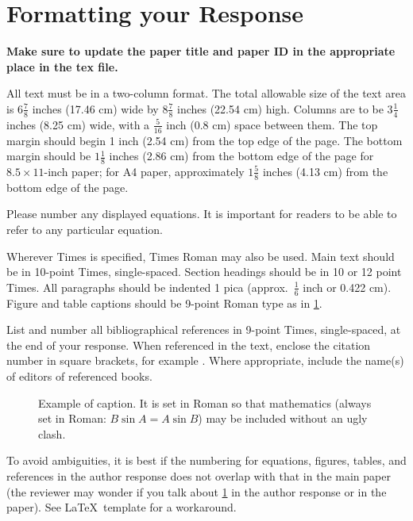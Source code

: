 \documentclass[10pt,twocolumn,letterpaper]{article}
\begin{document}
\section{Formatting your Response}

 {\bf Make sure to update the paper title and paper ID in the appropriate place in the tex file.}

All text must be in a two-column format.
The total allowable size of the text area is $6\frac78$ inches (17.46 cm) wide by $8\frac78$ inches (22.54 cm) high.
Columns are to be $3\frac14$ inches (8.25 cm) wide, with a $\frac{5}{16}$ inch (0.8 cm) space between them.
The top margin should begin 1 inch (2.54 cm) from the top edge of the page.
The bottom margin should be $1\frac{1}{8}$ inches (2.86 cm) from the bottom edge of the page for $8.5 \times 11$-inch paper;
for A4 paper, approximately $1\frac{5}{8}$ inches (4.13 cm) from the bottom edge of the page.

Please number any displayed equations.
It is important for readers to be able to refer to any particular equation.

Wherever Times is specified, Times Roman may also be used.
Main text should be in 10-point Times, single-spaced.
Section headings should be in 10 or 12 point Times.
All paragraphs should be indented 1 pica (approx.~$\frac{1}{6}$ inch or 0.422 cm).
Figure and table captions should be 9-point Roman type as in \cref{fig:onecol}.


List and number all bibliographical references in 9-point Times, single-spaced,
at the end of your response.
When referenced in the text, enclose the citation number in square brackets, for example \cite{Alpher05}.
Where appropriate, include the name(s) of editors of referenced books.

\begin{figure}[t]
  \centering
  \fbox{\rule{0pt}{0.5in} \rule{0.9\linewidth}{0pt}}
  \caption{Example of caption.  It is set in Roman so that mathematics
    (always set in Roman: $B \sin A = A \sin B$) may be included without an
    ugly clash.}
  \label{fig:onecol}
\end{figure}

To avoid ambiguities, it is best if the numbering for equations, figures, tables, and references in the author response does not overlap with that in the main paper (the reviewer may wonder if you talk about \cref{fig:onecol} in the author response or in the paper).
See \LaTeX\ template for a workaround.
\end{document}
